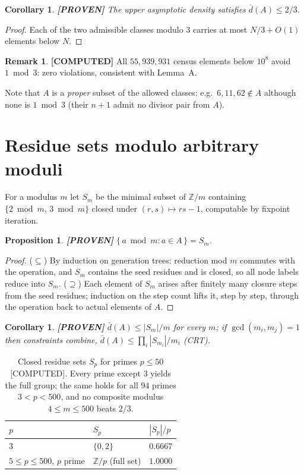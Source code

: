 \documentclass[11pt]{article}
\newtheorem{proposition}[theorem]{Proposition}
\newtheorem{corollary}[theorem]{Corollary}
\theoremstyle{definition}
\newtheorem{remark}[theorem]{Remark}
\newcommand{\A}{A}
\newcommand{\Z}{\mathbb{Z}}
\begin{document}
\begin{corollary}\label{cor:density}\textbf{[PROVEN]}
The upper asymptotic density satisfies $\bar d(\A)\le 2/3$.
\end{corollary}

\begin{proof}
Each of the two admissible classes modulo $3$ carries at most $N/3+O(1)$
elements below $N$.
\end{proof}

\begin{remark}\textbf{[COMPUTED]}
All $55{,}939{,}931$ census elements below $10^8$ avoid $1\bmod3$: zero
violations, consistent with Lemma~A.
\end{remark}

Note that $\A$ is a \emph{proper} subset of the allowed classes: e.g.\
$6,11,62\notin\A$ although none is $1\bmod3$ (their $n+1$ admit no divisor pair
from $\A$).

\section{Residue sets modulo arbitrary moduli}\label{sec:residues}

For a modulus $m$ let $S_m$ be the minimal subset of $\Z/m$ containing
$\{2\bmod m,\,3\bmod m\}$ closed under $(r,s)\mapsto rs-1$, computable by
fixpoint iteration.

\begin{proposition}\label{prop:S_m}\textbf{[PROVEN]}
$\{\,a\bmod m : a\in\A\,\}=S_m$.
\end{proposition}

\begin{proof}
($\subseteq$) By induction on generation trees: reduction mod $m$ commutes with
the operation, and $S_m$ contains the seed residues and is closed, so all node
labels reduce into $S_m$. ($\supseteq$) Each element of $S_m$ arises after
finitely many closure steps from the seed residues; induction on the step count
lifts it, step by step, through the operation back to actual elements of $\A$.
\end{proof}

\begin{corollary}\label{cor:crt}\textbf{[PROVEN]}
$\bar d(\A)\le |S_m|/m$ for every $m$; if $\gcd(m_i,m_j)=1$ then constraints
combine, $\bar d(\A)\le\prod_i |S_{m_i}|/m_i$ (CRT).
\end{corollary}

\begin{table}[ht]
\centering
\caption{Closed residue sets $S_p$ for primes $p\le50$ [COMPUTED]. Every prime
except $3$ yields the full group; the same holds for all $94$ primes
$3<p<500$, and no composite modulus $4\le m\le500$ beats $2/3$.}
\label{tab:sp}
\begin{tabular}{lll}
\toprule
$p$ & $S_p$ & $|S_p|/p$\\
\midrule
3 & $\{0,2\}$ & $0.6667$\\
$5\le p\le500$, $p$ prime & $\Z/p$ (full set) & $1.0000$\\
\bottomrule
\end{tabular}
\end{table}
\end{document}
